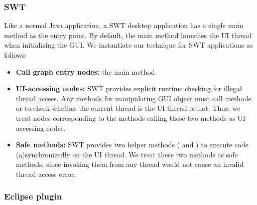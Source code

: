
\subsubsection{SWT}

Like a normal Java application, a SWT desktop application
has a single main method as the entry point. By default,
the main method launches the UI thread when initializing the GUI.
We instantiate our technique for SWT applications as follows:


\begin{itemize}

\item \textbf{Call graph entry nodes: } the main method

\item \textbf{UI-accessing nodes: } SWT provides explicit
runtime checking for illegal thread access. Any methods for manipulating
GUI object must call methods 
or  to check whether the current
thread is the UI thread or not.
Thus, we treat nodes corresponding to the methods
calling these two methods as UI-accessing nodes.

\item \textbf{Safe methods: } SWT provides two helper methods (
and ) to execute code (a)synchronizedly on the UI thread.
We treat these two methods as safe methods, since invoking
them from any thread 
would not cause an invalid thread access error.

\end{itemize}

\subsubsection{Eclipse plugin}

